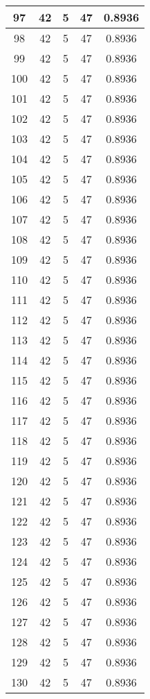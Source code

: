 \documentclass[letterpaper, 12pt]{article}
\begin{document}
\begin{longtable}{|c|c|c|c|c|}
\hline
97 & 42 & 5 & 47 & 0.8936 \\
\hline
98 & 42 & 5 & 47 & 0.8936 \\
\hline
99 & 42 & 5 & 47 & 0.8936 \\
\hline
100 & 42 & 5 & 47 & 0.8936 \\
\hline
101 & 42 & 5 & 47 & 0.8936 \\
\hline
102 & 42 & 5 & 47 & 0.8936 \\
\hline
103 & 42 & 5 & 47 & 0.8936 \\
\hline
104 & 42 & 5 & 47 & 0.8936 \\
\hline
105 & 42 & 5 & 47 & 0.8936 \\
\hline
106 & 42 & 5 & 47 & 0.8936 \\
\hline
107 & 42 & 5 & 47 & 0.8936 \\
\hline
108 & 42 & 5 & 47 & 0.8936 \\
\hline
109 & 42 & 5 & 47 & 0.8936 \\
\hline
110 & 42 & 5 & 47 & 0.8936 \\
\hline
111 & 42 & 5 & 47 & 0.8936 \\
\hline
112 & 42 & 5 & 47 & 0.8936 \\
\hline
113 & 42 & 5 & 47 & 0.8936 \\
\hline
114 & 42 & 5 & 47 & 0.8936 \\
\hline
115 & 42 & 5 & 47 & 0.8936 \\
\hline
116 & 42 & 5 & 47 & 0.8936 \\
\hline
117 & 42 & 5 & 47 & 0.8936 \\
\hline
118 & 42 & 5 & 47 & 0.8936 \\
\hline
119 & 42 & 5 & 47 & 0.8936 \\
\hline
120 & 42 & 5 & 47 & 0.8936 \\
\hline
121 & 42 & 5 & 47 & 0.8936 \\
\hline
122 & 42 & 5 & 47 & 0.8936 \\
\hline
123 & 42 & 5 & 47 & 0.8936 \\
\hline
124 & 42 & 5 & 47 & 0.8936 \\
\hline
125 & 42 & 5 & 47 & 0.8936 \\
\hline
126 & 42 & 5 & 47 & 0.8936 \\
\hline
127 & 42 & 5 & 47 & 0.8936 \\
\hline
128 & 42 & 5 & 47 & 0.8936 \\
\hline
129 & 42 & 5 & 47 & 0.8936 \\
\hline
130 & 42 & 5 & 47 & 0.8936 \\

\end{longtable}
\end{document}
